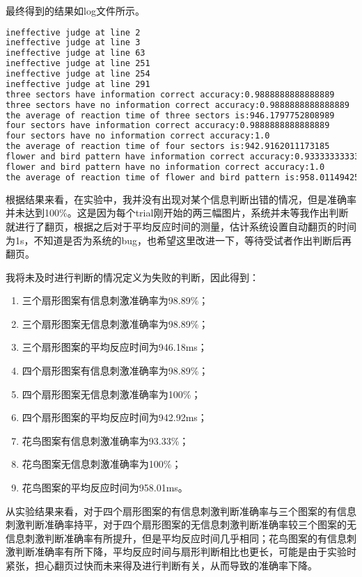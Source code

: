 \documentclass{hitreport}
\begin{document}
最终得到的结果如log文件所示。
\begin{lstlisting}[language=bash]
ineffective judge at line 2
ineffective judge at line 3
ineffective judge at line 63
ineffective judge at line 251
ineffective judge at line 254
ineffective judge at line 291
three sectors have information correct accuracy:0.9888888888888889
three sectors have no information correct accuracy:0.9888888888888889
the average of reaction time of three sectors is:946.1797752808989
four sectors have information correct accuracy:0.9888888888888889
four sectors have no information correct accuracy:1.0
the average of reaction time of four sectors is:942.9162011173185
flower and bird pattern have information correct accuracy:0.9333333333333333
flower and bird pattern have no information correct accuracy:1.0
the average of reaction time of flower and bird pattern is:958.0114942528736

\end{lstlisting}

根据结果来看，在实验中，我并没有出现对某个信息判断出错的情况，但是准确率并未达到100\%。这是因为每个trial刚开始的两三幅图片，系统并未等我作出判断就进行了翻页，根据之后对于平均反应时间的测量，估计系统设置自动翻页的时间为1s，不知道是否为系统的bug，也希望这里改进一下，等待受试者作出判断后再翻页。

我将未及时进行判断的情况定义为失败的判断，因此得到：
\begin{enumerate}
\item 三个扇形图案有信息刺激准确率为98.89\%；
\item 三个扇形图案无信息刺激准确率为98.89\%；
\item 三个扇形图案的平均反应时间为946.18ms；
\item 四个扇形图案有信息刺激准确率为98.89\%；
\item 四个扇形图案无信息刺激准确率为100\%；
\item 四个扇形图案的平均反应时间为942.92ms；
\item 花鸟图案有信息刺激准确率为93.33\%；
\item 花鸟图案无信息刺激准确率为100\%；
\item 花鸟图案的平均反应时间为958.01ms。
\end{enumerate}

从实验结果来看，对于四个扇形图案的有信息刺激判断准确率与三个图案的有信息刺激判断准确率持平，对于四个扇形图案的无信息刺激判断准确率较三个图案的无信息刺激判断准确率有所提升，但是平均反应时间几乎相同；花鸟图案的有信息刺激判断准确率有所下降，平均反应时间与扇形判断相比也更长，可能是由于实验时紧张，担心翻页过快而未来得及进行判断有关，从而导致的准确率下降。
\end{document}
